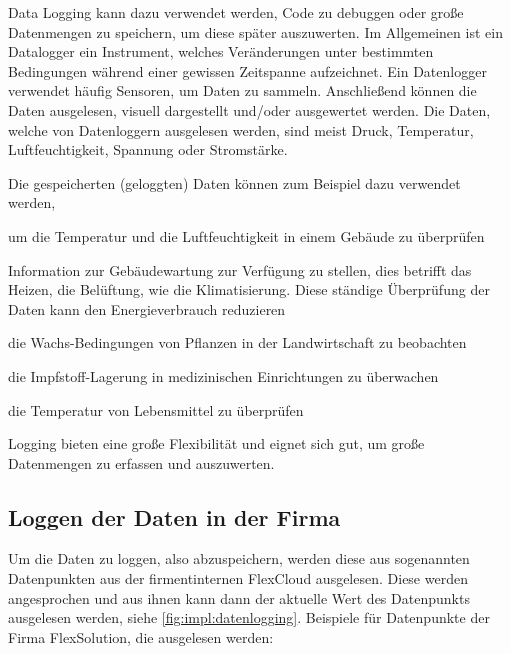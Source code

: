 
Data Logging kann dazu verwendet werden, Code zu debuggen oder große Datenmengen zu speichern, um diese später auszuwerten. Im Allgemeinen ist ein Datalogger ein Instrument, welches Veränderungen unter bestimmten Bedingungen während einer gewissen Zeitspanne aufzeichnet. Ein Datenlogger verwendet häufig Sensoren, um Daten zu sammeln. Anschließend können die Daten ausgelesen, visuell dargestellt und/oder ausgewertet werden. Die Daten, welche von Datenloggern ausgelesen werden, sind meist Druck, Temperatur, Luftfeuchtigkeit, Spannung oder Stromstärke. \cite{DataLogging} 

Die gespeicherten (geloggten) Daten können zum Beispiel dazu verwendet werden, 

\begin{compactitem}
    \item um die Temperatur und die Luftfeuchtigkeit in einem Gebäude zu überprüfen
    \item Information zur Gebäudewartung zur Verfügung zu stellen, dies betrifft das Heizen, die Belüftung, wie die Klimatisierung. Diese ständige Überprüfung der Daten kann den Energieverbrauch reduzieren
    \item die Wachs-Bedingungen von Pflanzen in der Landwirtschaft zu beobachten
    \item die Impfstoff-Lagerung in medizinischen Einrichtungen zu überwachen
    \item die Temperatur von Lebensmittel zu überprüfen
\end{compactitem}
\cite{DataLogging}

Logging bieten eine große Flexibilität und eignet sich gut, um große Datenmengen zu erfassen und auszuwerten. \cite{BigDataBuch}

\subsection{Loggen der Daten in der Firma}
Um die Daten zu loggen, also abzuspeichern, werden diese aus sogenannten Datenpunkten aus der firmentinternen FlexCloud ausgelesen. Diese werden angesprochen und aus ihnen kann dann der aktuelle Wert des Datenpunkts ausgelesen werden, siehe \ref{fig:impl:datenlogging}.
Beispiele für Datenpunkte der Firma FlexSolution, die ausgelesen werden: 

